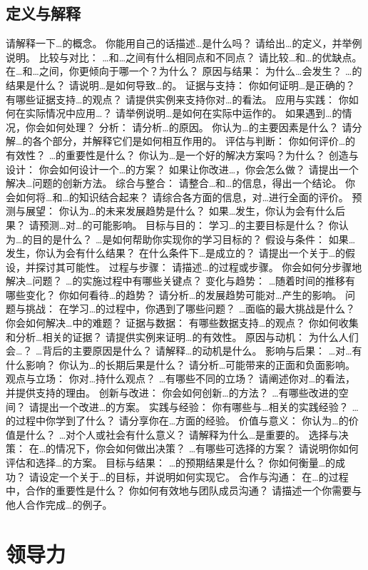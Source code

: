 \documentclass[12pt]{book}
\begin{document}
\section{定义与解释}
请解释一下…的概念。
你能用自己的话描述…是什么吗？
请给出…的定义，并举例说明。
比较与对比：
…和…之间有什么相同点和不同点？
请比较…和…的优缺点。
在…和…之间，你更倾向于哪一个？为什么？
原因与结果：
为什么…会发生？
…的结果是什么？
请说明…是如何导致…的。
证据与支持：
你如何证明…是正确的？
有哪些证据支持…的观点？
请提供实例来支持你对…的看法。
应用与实践：
你如何在实际情况中应用…？
请举例说明…是如何在实际中运作的。
如果遇到…的情况，你会如何处理？
分析：
请分析…的原因。
你认为…的主要因素是什么？
请分解…的各个部分，并解释它们是如何相互作用的。
评估与判断：
你如何评价…的有效性？
…的重要性是什么？
你认为…是一个好的解决方案吗？为什么？
创造与设计：
你会如何设计一个…的方案？
如果让你改进…，你会怎么做？
请提出一个解决…问题的创新方法。
综合与整合：
请整合…和…的信息，得出一个结论。
你会如何将…和…的知识结合起来？
请综合各方面的信息，对…进行全面的评价。
预测与展望：
你认为…的未来发展趋势是什么？
如果…发生，你认为会有什么后果？
请预测…对…的可能影响。
目标与目的：
学习…的主要目标是什么？
你认为…的目的是什么？
…是如何帮助你实现你的学习目标的？
假设与条件：
如果…发生，你认为会有什么结果？
在什么条件下…是成立的？
请提出一个关于…的假设，并探讨其可能性。
过程与步骤：
请描述…的过程或步骤。
你会如何分步骤地解决…问题？
…的实施过程中有哪些关键点？
变化与趋势：
…随着时间的推移有哪些变化？
你如何看待…的趋势？
请分析…的发展趋势可能对…产生的影响。
问题与挑战：
在学习…的过程中，你遇到了哪些问题？
…面临的最大挑战是什么？
你会如何解决…中的难题？
证据与数据：
有哪些数据支持…的观点？
你如何收集和分析…相关的证据？
请提供实例来证明…的有效性。
原因与动机：
为什么人们会…？
…背后的主要原因是什么？
请解释…的动机是什么。
影响与后果：
…对…有什么影响？
你认为…的长期后果是什么？
请分析…可能带来的正面和负面影响。
观点与立场：
你对…持什么观点？
…有哪些不同的立场？
请阐述你对…的看法，并提供支持的理由。
创新与改进：
你会如何创新…的方法？
…有哪些改进的空间？
请提出一个改进…的方案。
实践与经验：
你有哪些与…相关的实践经验？
…的过程中你学到了什么？
请分享你在…方面的经验。
价值与意义：
你认为…的价值是什么？
…对个人或社会有什么意义？
请解释为什么…是重要的。
选择与决策：
在…的情况下，你会如何做出决策？
…有哪些可选择的方案？
请说明你如何评估和选择…的方案。
目标与结果：
…的预期结果是什么？
你如何衡量…的成功？
请设定一个关于…的目标，并说明如何实现它。
合作与沟通：
在…的过程中，合作的重要性是什么？
你如何有效地与团队成员沟通？
请描述一个你需要与他人合作完成…的例子。


\chapter{领导力}
\end{document}
